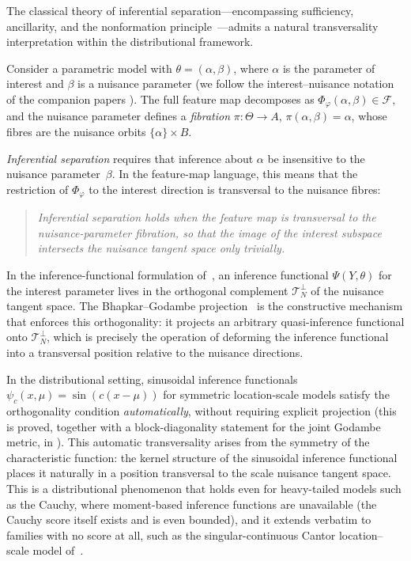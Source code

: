 \documentclass[11pt,a4paper]{article}
\begin{document}
The classical theory of inferential separation---encompassing
sufficiency, ancillarity, and the nonformation
principle~\cite{BarndorffNielsen1978,JorgensenLabouriau2012}---admits a
natural transversality interpretation within the distributional
framework.

Consider a parametric model with $\theta=(\alpha,\beta)$, where
$\alpha$ is the parameter of interest and $\beta$ is a nuisance
parameter (we follow the interest--nuisance notation of the companion
papers \cite{C,E}).  The
full feature map decomposes as
$\Phi_\varphi(\alpha,\beta) \in \mathcal{F}$, and the nuisance
parameter defines a \emph{fibration}
$\pi:\Theta\to A$, $\pi(\alpha,\beta)=\alpha$, whose fibres are the
nuisance orbits $\{\alpha\}\times B$.

\emph{Inferential separation} requires that inference about $\alpha$ be
insensitive to the nuisance parameter~$\beta$.  In the feature-map
language, this means that the restriction of $\Phi_\varphi$ to the
interest direction is transversal to the nuisance fibres:
\begin{quote}
\emph{Inferential separation holds when the feature map is transversal
to the nuisance-parameter fibration, so that the image of the
interest subspace intersects the nuisance tangent space only
trivially.}
\end{quote}

In the inference-functional formulation of~\cite{C}, an inference
functional $\Psi(Y,\theta)$ for the interest parameter lives in the
orthogonal complement $\mathcal{T}_N^\perp$ of the nuisance tangent
space.  The Bhapkar--Godambe
projection~\cite{Godambe1960,JorgensenLabouriau2012} is the
constructive mechanism that enforces this orthogonality: it projects
an arbitrary quasi-inference functional onto $\mathcal{T}_N^\perp$,
which is precisely the operation of deforming the inference functional
into a transversal position relative to the nuisance directions.

In the distributional setting, sinusoidal inference functionals
$\psi_c(x,\mu) = \sin(c(x-\mu))$ for symmetric location-scale
models satisfy the orthogonality condition \emph{automatically},
without requiring explicit projection (this is proved, together with
a block-diagonality statement for the joint Godambe metric, in
\cite{E}).  This automatic
transversality arises from the symmetry of the characteristic
function: the kernel structure of the sinusoidal inference functional
places it naturally in a position transversal to the scale nuisance
tangent space.  This is a distributional phenomenon that holds even
for heavy-tailed models such as the Cauchy, where moment-based
inference functions are unavailable (the Cauchy score itself exists
and is even bounded), and it extends verbatim to families with no
score at all, such as the singular-continuous Cantor location--scale
model of~\cite{E}.
\end{document}
